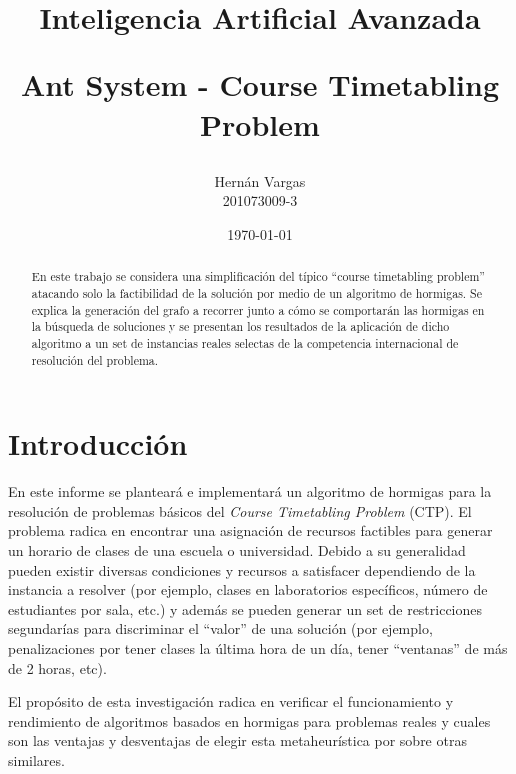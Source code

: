 \documentclass[letter, 10pt]{article}
\begin{document}
\title{
  Inteligencia Artificial Avanzada\\ 
  \begin{Large}
    Ant System - Course Timetabling Problem
  \end{Large}
}
\author{Hernán Vargas \\ 201073009-3}
\date{\today}
\maketitle

\begin{abstract}
  En este trabajo se considera una simplificación del típico ``course
  timetabling problem'' atacando solo la factibilidad de la solución por medio
  de un algoritmo de hormigas.
  Se explica la generación del grafo a recorrer junto a cómo se comportarán las
  hormigas en la búsqueda de soluciones y se presentan los resultados de la
  aplicación de dicho algoritmo a un set de instancias reales selectas de la
  competencia internacional de resolución del problema.
\end{abstract}

\section{Introducción}\label{sec:intro}
En este informe se planteará e implementará un algoritmo de hormigas para la 
resolución de problemas básicos del \emph{Course Timetabling Problem} (CTP).
El problema radica en encontrar una asignación de recursos factibles para
generar un horario de clases de una escuela o universidad. Debido a su
generalidad pueden existir diversas condiciones y recursos a satisfacer
dependiendo de la instancia a resolver (por ejemplo, clases en laboratorios
específicos, número de estudiantes por sala, etc.) y además se pueden generar
un set de restricciones segundarías para discriminar el ``valor'' de una
solución (por ejemplo, penalizaciones por tener clases la última hora de un día,
tener ``ventanas'' de más de 2 horas, etc).

El propósito de esta investigación radica en verificar el funcionamiento y
rendimiento de algoritmos basados en hormigas para problemas reales y cuales son
las ventajas y desventajas de elegir esta metaheurística por sobre otras 
similares.
\end{document}
